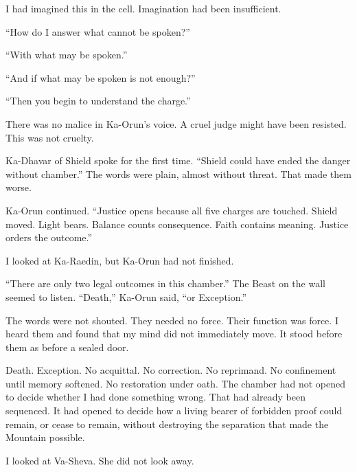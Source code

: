I had imagined this in the cell. Imagination had been insufficient.\par

``How do I answer what cannot be spoken?''\par

``With what may be spoken.''\par

``And if what may be spoken is not enough?''\par

``Then you begin to understand the charge.''\par

There was no malice in Ka-Orun's voice. A cruel judge might have been resisted. This was not cruelty.\par

Ka-Dhavar of Shield spoke for the first time. ``Shield could have ended the danger without chamber.'' The words were plain, almost without threat. That made them worse.\par

Ka-Orun continued. ``Justice opens because all five charges are touched. Shield moved. Light bears. Balance counts consequence. Faith contains meaning. Justice orders the outcome.''\par

I looked at Ka-Raedin, but Ka-Orun had not finished.\par

``There are only two legal outcomes in this chamber.'' The Beast on the wall seemed to listen. ``Death,'' Ka-Orun said, ``or Exception.''\par

The words were not shouted. They needed no force. Their function was force. I heard them and found that my mind did not immediately move. It stood before them as before a sealed door.\par

Death. Exception. No acquittal. No correction. No reprimand. No confinement until memory softened. No restoration under oath. The chamber had not opened to decide whether I had done something wrong. That had already been sequenced. It had opened to decide how a living bearer of forbidden proof could remain, or cease to remain, without destroying the separation that made the Mountain possible.\par

I looked at Va-Sheva. She did not look away.\par

